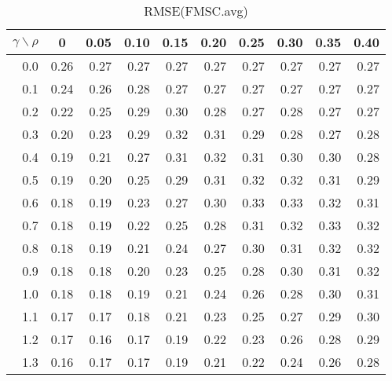 \documentclass[12pt]{article}
\begin{document}
%
\begin{table}[!tbp]
\caption{RMSE(FMSC.avg)}
 \begin{center}
 \begin{tabular}{r|rrrrrrrrr}\hline\hline
\multicolumn{1}{c|}{$\gamma\backslash\rho$}&\multicolumn{1}{c}{0}&\multicolumn{1}{c}{0.05}&\multicolumn{1}{c}{0.10}&\multicolumn{1}{c}{0.15}&\multicolumn{1}{c}{0.20}&\multicolumn{1}{c}{0.25}&\multicolumn{1}{c}{0.30}&\multicolumn{1}{c}{0.35}&\multicolumn{1}{c}{0.40}\tabularnewline
\hline

0.0&0.26&0.27&0.27&0.27&0.27&0.27&0.27&0.27&0.27\tabularnewline
0.1&0.24&0.26&0.28&0.27&0.27&0.27&0.27&0.27&0.27\tabularnewline
0.2&0.22&0.25&0.29&0.30&0.28&0.27&0.28&0.27&0.27\tabularnewline
0.3&0.20&0.23&0.29&0.32&0.31&0.29&0.28&0.27&0.28\tabularnewline
0.4&0.19&0.21&0.27&0.31&0.32&0.31&0.30&0.30&0.28\tabularnewline
0.5&0.19&0.20&0.25&0.29&0.31&0.32&0.32&0.31&0.29\tabularnewline
0.6&0.18&0.19&0.23&0.27&0.30&0.33&0.33&0.32&0.31\tabularnewline
0.7&0.18&0.19&0.22&0.25&0.28&0.31&0.32&0.33&0.32\tabularnewline
0.8&0.18&0.19&0.21&0.24&0.27&0.30&0.31&0.32&0.32\tabularnewline
0.9&0.18&0.18&0.20&0.23&0.25&0.28&0.30&0.31&0.32\tabularnewline
1.0&0.18&0.18&0.19&0.21&0.24&0.26&0.28&0.30&0.31\tabularnewline
1.1&0.17&0.17&0.18&0.21&0.23&0.25&0.27&0.29&0.30\tabularnewline
1.2&0.17&0.16&0.17&0.19&0.22&0.23&0.26&0.28&0.29\tabularnewline
1.3&0.16&0.17&0.17&0.19&0.21&0.22&0.24&0.26&0.28\tabularnewline
\hline
\end{tabular}

\end{center}

\end{table}

%
\end{document}
